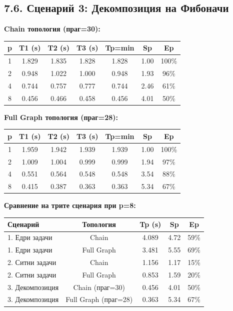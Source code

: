 \documentclass[12pt,a4paper]{article}
\begin{document}
\subsection*{7.6. Сценарий 3: Декомпозиция на Фибоначи}

\textbf{Chain топология (праг=30):}

\begin{center}
\begin{tabular}{|c|c|c|c|c|c|c|}
\hline
\textbf{p} & \textbf{T1 (s)} & \textbf{T2 (s)} & \textbf{T3 (s)} & \textbf{Tp=min} & \textbf{Sp} & \textbf{Ep} \\
\hline
1 & 1.829 & 1.835 & 1.828 & 1.828 & 1.00 & 100\% \\
\hline
2 & 0.948 & 1.022 & 1.000 & 0.948 & 1.93 & 96\% \\
\hline
4 & 0.744 & 0.757 & 0.777 & 0.744 & 2.46 & 61\% \\
\hline
8 & 0.456 & 0.466 & 0.458 & 0.456 & 4.01 & 50\% \\
\hline
\end{tabular}
\end{center}

\vspace{0.5cm}
\textbf{Full Graph топология (праг=28):}

\begin{center}
\begin{tabular}{|c|c|c|c|c|c|c|}
\hline
\textbf{p} & \textbf{T1 (s)} & \textbf{T2 (s)} & \textbf{T3 (s)} & \textbf{Tp=min} & \textbf{Sp} & \textbf{Ep} \\
\hline
1 & 1.959 & 1.942 & 1.939 & 1.939 & 1.00 & 100\% \\
\hline
2 & 1.009 & 1.004 & 0.999 & 0.999 & 1.94 & 97\% \\
\hline
4 & 0.551 & 0.564 & 0.548 & 0.548 & 3.54 & 88\% \\
\hline
8 & 0.415 & 0.387 & 0.363 & 0.363 & 5.34 & 67\% \\
\hline
\end{tabular}
\end{center}

\vspace{0.5cm}
\textbf{Сравнение на трите сценария при p=8:}

\begin{center}
\begin{tabular}{|l|c|c|c|c|}
\hline
\textbf{Сценарий} & \textbf{Топология} & \textbf{Tp (s)} & \textbf{Sp} & \textbf{Ep} \\
\hline
1. Едри задачи & Chain & 4.089 & 4.72 & 59\% \\
\hline
1. Едри задачи & Full Graph & 3.481 & 5.55 & 69\% \\
\hline
2. Ситни задачи & Chain & 1.156 & 1.17 & 15\% \\
\hline
2. Ситни задачи & Full Graph & 0.853 & 1.59 & 20\% \\
\hline
3. Декомпозиция & Chain (праг=30) & 0.456 & 4.01 & 50\% \\
\hline
3. Декомпозиция & Full Graph (праг=28) & 0.363 & 5.34 & 67\% \\
\hline
\end{tabular}
\end{center}
\end{document}
